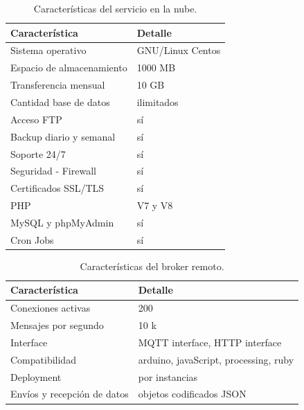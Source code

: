 \begin{table}[h]
	\centering
	\caption[Características del servicio en la nube]{Características del servicio en la nube.}
	\begin{tabular}{p{7cm} p{5cm} }    
		\toprule
		\textbf{Característica} 	 & \textbf{Detalle}  \\
		\midrule
		Sistema operativo  & GNU/Linux Centos\\		
		Espacio de almacenamiento & 1000 MB \\
		Transferencia mensual  & 10 GB\\				
		Cantidad base de datos 	  & ilimitados\\
		Acceso FTP 	  & sí\\
		Backup diario y semanal 	  & sí\\
		Soporte 24/7 	  & sí\\
		Seguridad - Firewall	  & sí\\
		Certificados SSL/TLS	  & sí\\
		PHP	  & V7 y V8\\
		MySQL y	phpMyAdmin  & sí\\
		Cron Jobs	  & sí\\
		\bottomrule
		\hline
	\end{tabular}
	\label{tab:serverweb}
\end{table}


\begin{table}[h]
	\centering
	\caption[Características del broker remoto]{Características del broker remoto.}
	\begin{tabular}{p{5cm} p{7cm} }    
		\toprule
		\textbf{Característica} 	 & \textbf{Detalle}  \\
		\midrule
		Conexiones activas  & 200\\		
		Mensajes por segundo & 10 k \\
		Interface  & MQTT interface, HTTP interface\\		
		Compatibilidad & arduino, javaScript, processing, ruby \\		
		Deployment 	  & por instancias\\
		Envíos y recepción de datos & objetos codificados JSON\\
		
		\bottomrule
		\hline
	\end{tabular}
	\label{tab:brokerremoto}
\end{table}




